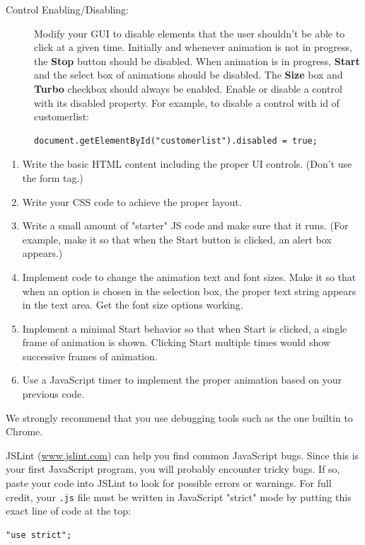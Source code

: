 \documentclass{article}
\newcommand{\myitem}[1]{\noindent\hspace{-.25in}{\large\bf #1}}
\begin{document}
\begin{description}
\item[Control Enabling/Disabling:] Modify your GUI to disable
elements that the user shouldn't be able to click at a given time.
Initially and whenever animation is not in progress, the {\bf Stop} button
should be disabled.  When animation is in progress, {\bf Start} and the
select box of animations should be disabled.  The {\bf Size} box and
{\bf Turbo}
checkbox should always be enabled.  Enable or disable a control with
its disabled property.  For example, to disable a control with id of
customerlist:
\begin{Verbatim}[frame=single]
  document.getElementById("customerlist").disabled = true;
\end{Verbatim}

\end{description}

\myitem{Development strategy:}
\begin{enumerate}
  \item Write the basic HTML content
    including the proper UI controls.  (Don't use the form tag.)
  \item
    Write
    your CSS code to achieve the proper layout.
  \item
    Write a small amount
of "starter" JS code and make sure that it runs.  (For example, make
it so that when the Start button is clicked, an alert box appears.)
\item
  Implement code to change the animation text and font sizes.  Make
it so that when an option is chosen in the selection box, the proper
text string appears in the text area.  Get the font size options
working.
\item
  Implement a minimal Start behavior so that when Start is
clicked, a single frame of animation is shown. Clicking Start multiple
times would show successive frames of animation.
\item Use a JavaScript
timer to implement the proper animation based on your previous code.
\end{enumerate}

\myitem{Debugging:}

We strongly recommend that you use debugging tools
such as the one builtin to Chrome.  

JSLint (\url{www.jslint.com}) can
help you find common JavaScript bugs.  Since this is your first
JavaScript program, you will probably encounter tricky bugs.  If so,
paste your code into JSLint to look for possible errors or warnings.
For full credit, your {\tt .js} file must be written in JavaScript "strict"
mode by putting this exact line of code at the top:
\begin{Verbatim}[frame=single]
  "use strict";
  \end{Verbatim}
\end{document}
